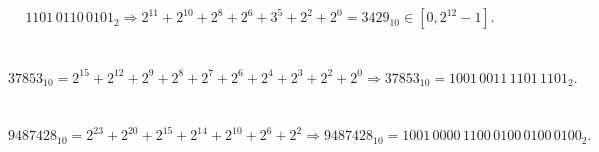 \documentclass[
  coursecode={MTHE 418},
  assignmentname={Homework \homeworknumber},
  studentnumber=20053722,
  name={Bryan Hoang},
  draft,
  final,
]{
  ltxanswer%
}
\begin{document}
  \begin{questions}
    \setcounter{question}{\questionnumber}
    \addtocounter{question}{-1}
    \question[10]\
    \begin{parts}
      \part{}
      \begin{solution}
        \begin{equation*}
          1101\,0110\,0101_{2} \Rightarrow 2^{11} + 2^{10} + 2^{8} + 2^{6} + 3^{5} + 2^{2} + 2^{0} = \boxed{3429_{10}} \in [0, 2^{12}-1].
        \end{equation*}
      \end{solution}

      \part{}
      \begin{solution}
        \begin{equation*}
          37853_{10} = 2^{15} + 2^{12} + 2^{9} + 2^{8} + 2^{7} + 2^{6} + 2^{4} + 2^{3} + 2^{2} + 2^{0} \Rightarrow 37853_{10} = \boxed{1001\,0011\,1101\,1101_{2}}.
        \end{equation*}
      \end{solution}

      \part{}
      \begin{solution}
        \begin{equation*}
          9487428_{10} = 2^{23} + 2^{20} + 2^{15} + 2^{14} + 2^{10} + 2^{6} + 2^{2} \Rightarrow 9487428_{10} = \boxed{1001\,0000\,1100\,0100\,0100\,0100_{2}}.
        \end{equation*}
      \end{solution}
    \end{parts}
  \end{questions}
\end{document}
